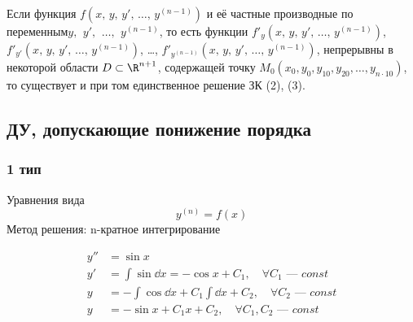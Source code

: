 \begin{theorem}
    Если функция $f\left(x,\, y,\, y',\, \ldots,\, y^{(n-1)}\right)$ и её частные производные по переменным\break$y,\,\ y',\,\ \ldots,\,\ y^{(n-1)}$, то есть функции $f'_y\left(x,\, y,\, y',\, \ldots,\, y^{(n-1)}\right)$, $f'_{y'}\left(x,\, y,\, y',\, \ldots,\, y^{(n-1)}\right)$, \ldots , $f'_{y^{(n-1)}}\left(x,\, y,\, y',\, \ldots,\, y^{(n-1)}\right)$, непрерывны в некоторой области $D \subset \R^{n+1}$, содержащей точку $M_0(x_0, y_0, y_{10}, y_{20}, \ldots, y_{n\cdot 10})$, то существует и при том единственное решение ЗК (2), (3).
\end{theorem}

\subsection*{ДУ, допускающие понижение порядка}
\subsubsection*{1 тип}

Уравнения вида 
\[
    \boxed{y^{(n)} = f(x)} 
\]
Метод решения: n-кратное интегрирование \\

\begin{eg}
    \begin{align*}
        y'' &= \sin x \\
        y' &= \int \sin \dd{x} = -\cos x + C_1,\quad \forall C_1 \text{ --- } const \\
        y &= - \int \cos \dd{x} + C_1 \int \dd{x} + C_2,\quad \forall C_2 \text{ --- } const \\
        y &= - \sin x + C_1 x + C_2,\quad \forall C_1, C_2 \text{ --- } const
    \end{align*}
\end{eg}

